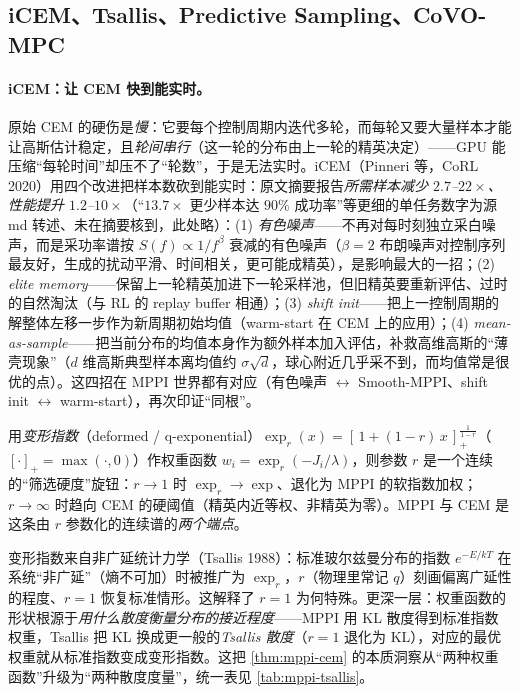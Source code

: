 \subsection{iCEM、Tsallis、Predictive Sampling、CoVO-MPC}
\label{sec:mppi-variants}

\paragraph{iCEM：让 CEM 快到能实时。}原始 CEM 的硬伤是\emph{慢}：它要每个控制周期内迭代多轮，而每轮又要大量样本才能让高斯估计稳定，且\emph{轮间串行}（这一轮的分布由上一轮的精英决定）——GPU 能压缩“每轮时间”却压不了“轮数”，于是无法实时。iCEM（Pinneri 等，CoRL 2020）用四个改进把样本数砍到能实时：原文摘要报告\emph{所需样本减少 $2.7$--$22\times$、性能提升 $1.2$--$10\times$}\cite{pinneri2020sample}（“$13.7\times$ 更少样本达 $90\%$ 成功率”等更细的单任务数字为源 md 转述、未在摘要核到，此处略）：(1) \emph{有色噪声}——不再对每时刻独立采白噪声，而是采功率谱按 $S(f)\propto1/f^\beta$ 衰减的有色噪声（$\beta=2$ 布朗噪声对控制序列最友好，生成的扰动平滑、时间相关，更可能成精英），是影响最大的一招；(2) \emph{elite memory}——保留上一轮精英加进下一轮采样池，但旧精英要重新评估、过时的自然淘汰（与 RL 的 replay buffer 相通）；(3) \emph{shift init}——把上一控制周期的解整体左移一步作为新周期初始均值（warm-start 在 CEM 上的应用）；(4) \emph{mean-as-sample}——把当前分布的均值本身作为额外样本加入评估，补救高维高斯的“薄壳现象”（$d$ 维高斯典型样本离均值约 $\sigma\sqrt d$，球心附近几乎采不到，而均值常是很优的点）。这四招在 MPPI 世界都有对应（有色噪声 $\leftrightarrow$ Smooth-MPPI、shift init $\leftrightarrow$ warm-start），再次印证“同根”。

\begin{theorem}\label{thm:mppi-tsallis}
用\emph{变形指数}（deformed / q-exponential）$\exp_r(x)=[\,1+(1-r)\,x\,]_+^{\frac{1}{1-r}}$（$[\cdot]_+=\max(\cdot,0)$）作权重函数 $w_i=\exp_r(-J_i/\lambda)$，则参数 $r$ 是一个连续的“筛选硬度”旋钮：$r\to1$ 时 $\exp_r\to\exp$、退化为 MPPI 的软指数加权；$r\to\infty$ 时趋向 CEM 的硬阈值（精英内近等权、非精英为零）。MPPI 与 CEM 是这条由 $r$ 参数化的连续谱的\emph{两个端点}\cite{wang2021variational}。
\end{theorem}

\noindent 变形指数来自非广延统计力学（Tsallis 1988\cite{tsallis1988possible}）：标准玻尔兹曼分布的指数 $e^{-E/kT}$ 在系统“非广延”（熵不可加）时被推广为 $\exp_r$，$r$（物理里常记 $q$）刻画偏离广延性的程度、$r=1$ 恢复标准情形。这解释了 $r=1$ 为何特殊。更深一层：权重函数的形状根源于\emph{用什么散度衡量分布的接近程度}——MPPI 用 KL 散度得到标准指数权重，Tsallis 把 KL 换成更一般的\emph{Tsallis 散度}（$r=1$ 退化为 KL），对应的最优权重就从标准指数变成变形指数。这把 \cref{thm:mppi-cem} 的本质洞察从“两种权重函数”升级为“两种散度度量”，统一表见 \cref{tab:mppi-tsallis}。

